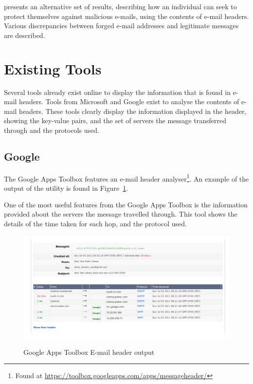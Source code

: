 \cite{Al-zarouni_tracinge-mail} presents an alternative set of results,
describing how an individual can seek to protect themselves against malicious
e-mails, using the contents of e-mail headers.  Various discrepancies between
forged e-mail addresses and legitimate messages are described.

\section{Existing Tools}

Several tools already exist online to display the information that is found in
e-mail headers.  Tools from Microsoft and Google exist to analyse the contents
of e-mail headers.  These tools clearly display the information displayed in
the header, showing the key-value pairs, and the set of servers the message
transferred through and the protocols used.

\subsection{Google}\label{sec:goo}

The Google Apps Toolbox features an e-mail header analyser\footnote{Found at
	\url{https://toolbox.googleapps.com/apps/messageheader/}}. An example
of the output of the utility is found in Figure~\ref{fig:goo}.

One of the most useful features from the Google Apps Toolbox is the information
provided about the servers the message travelled through.  This tool shows the
details of the time taken for each hop, and the protocol used.

\begin{figure}
	\begin{framed}
	\centering
	\includegraphics[width=0.9\linewidth]{google-header}\label{fig:goo}
\end{framed}
	\caption{Google Apps Toolbox E-mail header output} \end{figure}

